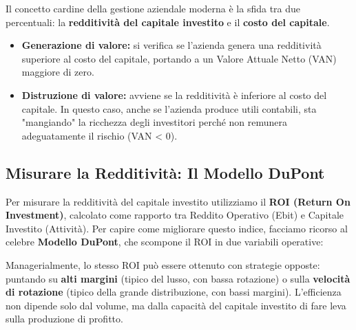 \documentclass[a4paper,10pt]{article}
\begin{document}
Il concetto cardine della gestione aziendale moderna è la sfida tra due percentuali: la \textbf{redditività del capitale investito} e il \textbf{costo del capitale}.
\begin{itemize}
    \item \textbf{Generazione di valore:} si verifica se l'azienda genera una redditività superiore al costo del capitale, portando a un Valore Attuale Netto (VAN) maggiore di zero.
    \item \textbf{Distruzione di valore:} avviene se la redditività è inferiore al costo del capitale. In questo caso, anche se l'azienda produce utili contabili, sta "mangiando" la ricchezza degli investitori perché non remunera adeguatamente il rischio (VAN < 0).
\end{itemize}

\subsection*{Misurare la Redditività: Il Modello DuPont}

Per misurare la redditività del capitale investito utilizziamo il \textbf{ROI (Return On Investment)}, calcolato come rapporto tra Reddito Operativo (Ebit) e Capitale Investito (Attività). Per capire come migliorare questo indice, facciamo ricorso al celebre \textbf{Modello DuPont}, che scompone il ROI in due variabili operative:

\begin{table}[H]
\setlength{\extrarowheight}{10pt}
\caption{Scomposizione del ROI secondo il sistema DuPont}
\end{table}

Managerialmente, lo stesso ROI può essere ottenuto con strategie opposte: puntando su \textbf{alti margini} (tipico del lusso, con bassa rotazione) o sulla \textbf{velocità di rotazione} (tipico della grande distribuzione, con bassi margini). L'efficienza non dipende solo dal volume, ma dalla capacità del capitale investito di fare leva sulla produzione di profitto.
\end{document}
